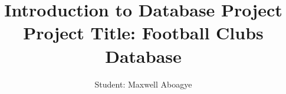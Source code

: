 \documentclass{article}[h]
\title{\huge Introduction to Database Project\\
    \vspace{6px}
    \huge \textbf {Project Title: Football Clubs Database}}
\author{Student: Maxwell Aboagye}
\begin{document}
\maketitle

\tableofcontents

\pagebreak






\end{document}
